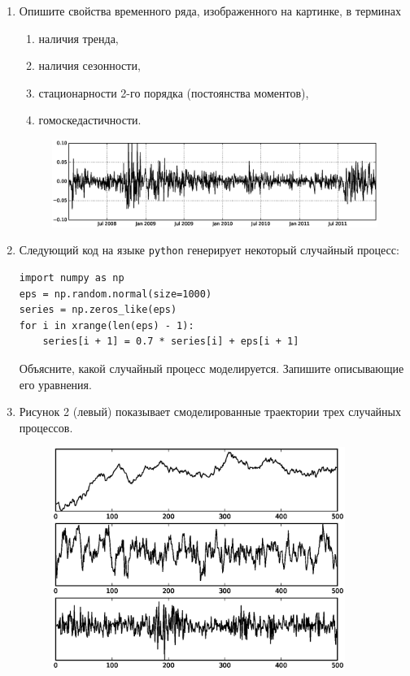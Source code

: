 \documentclass[a4paper,12pt]{extreport}
\renewcommand{\=}[1]{\stackrel{#1}{=}} %
\begin{document}
\begin{enumerate}

	\item Опишите свойства временного ряда, изображенного на картинке,
	в терминах
	\begin{enumerate}
		\item наличия тренда,
		\item наличия сезонности,
		\item стационарности 2-го порядка (постоянства моментов),
		\item гомоскедастичности.
	\end{enumerate}

	\begin{figure}[h!]
	\centering
	\includegraphics[width=\textwidth,
	trim=1cm 5mm 1cm 5mm, clip=True]
	{dax}
	\end{figure}	

	\item Следующий код на языке \texttt{python} генерирует некоторый случайный процесс:
	\vspace{-.5em}
	\begin{verbatim}
import numpy as np
eps = np.random.normal(size=1000)
series = np.zeros_like(eps)
for i in xrange(len(eps) - 1):
    series[i + 1] = 0.7 * series[i] + eps[i + 1]
	\end{verbatim}
	\vspace{-.5em}
	Объясните, какой случайный процесс моделируется. 
	Запишите описывающие его уравнения.

	\item Рисунок 2 (левый) показывает смоделированные
	траектории трех случайных процессов.

	\begin{figure}[h!]
	\centering
	\begin{minipage}{0.45\textwidth}
	\centering

	\includegraphics[width=0.9\textwidth,
	trim=1cm 10mm 1cm 10mm, clip=True]
	{bm_ar_arch}


\end{minipage}
\end{figure}
\end{enumerate}
\end{document}
